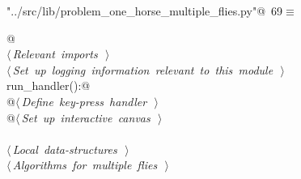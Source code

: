 \documentclass[11.5pt]{report}
\begin{document}
\begin{flushleft} \small\label{scrap99}\raggedright\small
{} \verb@"../src/lib/problem_one_horse_multiple_flies.py"@\nobreak\ {\footnotesize {69}}$\equiv$
\vspace{-1ex}
\begin{list}{}{} \item
\mbox{}\verb@    @\\
\mbox{}\verb@@\hbox{$\langle\,${\itshape Relevant imports}\nobreak\ {\footnotesize {}}$\,\rangle$}\verb@@\\
\mbox{}\verb@@\hbox{$\langle\,${\itshape Set up logging information relevant to this module}\nobreak\ {\footnotesize {}}$\,\rangle$}\verb@@\\
\mbox{}\verb@def run_handler():@\\
\mbox{}\verb@    @\hbox{$\langle\,${\itshape Define key-press handler}\nobreak\ {\footnotesize {}}$\,\rangle$}\verb@@\\
\mbox{}\verb@    @\hbox{$\langle\,${\itshape Set up interactive canvas}\nobreak\ {\footnotesize {}}$\,\rangle$}\verb@@\\
\mbox{}\verb@@\\
\mbox{}\verb@@\hbox{$\langle\,${\itshape Local data-structures}\nobreak\ {\footnotesize {}}$\,\rangle$}\verb@@\\
\mbox{}\verb@@\hbox{$\langle\,${\itshape Algorithms for multiple flies}\nobreak\ {\footnotesize {}}$\,\rangle$}\verb@@\\
\mbox{}\verb@@{\NWsep}
\end{list}
\vspace{-1.5ex}
\footnotesize
\begin{list}{}{\setlength{\itemsep}{-\parsep}\setlength{\itemindent}{-\leftmargin}}

\item{}
\end{list}
\vspace{4ex}
\end{flushleft}


\newpage
\end{document}
